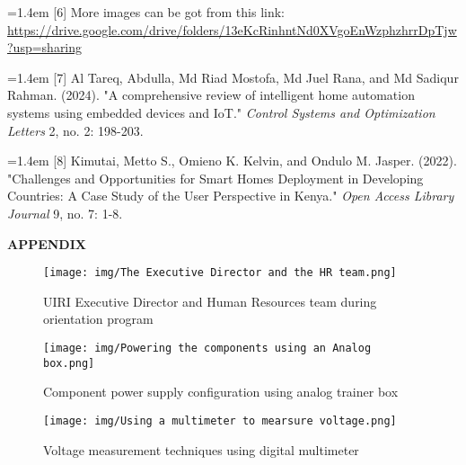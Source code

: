\documentclass[12pt,a4paper]{report}
\begin{document}
\noindent\hangindent=1.4em [6] More images can be got from this link: \\
\url{https://drive.google.com/drive/folders/13eKcRinhntNd0XVgoEnWzphzhrrDpTjw?usp=sharing}

\noindent\hangindent=1.4em [7] Al Tareq, Abdulla, Md Riad Mostofa, Md Juel Rana, and Md Sadiqur Rahman. (2024). "A comprehensive review of intelligent home automation systems using embedded devices and IoT." \textit{Control Systems and Optimization Letters} 2, no. 2: 198-203.
\vspace{0.2cm}

\noindent\hangindent=1.4em [8] Kimutai, Metto S., Omieno K. Kelvin, and Ondulo M. Jasper. (2022). "Challenges and Opportunities for Smart Homes Deployment in Developing Countries: A Case Study of the User Perspective in Kenya." \textit{Open Access Library Journal} 9, no. 7: 1-8.
\vspace{0.2cm}


\newpage
\appendix

{\fontsize{14}{16.8}\selectfont\bfseries\centering APPENDIX\par}
\vspace{10pt}

\begin{figure}[H]
\centering
\texttt{[image: img/The Executive Director and the HR team.png]}
\caption{UIRI Executive Director and Human Resources team during orientation program}
\label{fig:uiri-leadership}
\end{figure}

\begin{figure}[H]
\centering
\texttt{[image: img/Powering the components using an Analog box.png]}
\caption{Component power supply configuration using analog trainer box}
\label{fig:analog-power}
\end{figure}

\begin{figure}[H]
\centering
\texttt{[image: img/Using a multimeter to mearsure voltage.png]}
\caption{Voltage measurement techniques using digital multimeter}
\label{fig:multimeter-usage}
\end{figure}

\end{document}

